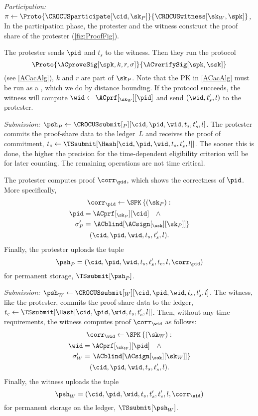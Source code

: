 \emph{Participation: \(\pi\gets
    \Proto{\CROCUSparticipate[\cid, \sk_P]}{\CROCUSwitness[\sk_W, \spk]}\),}
In the participation phase, the protester and 
the witness construct the proof share of the protester (\cref{fig:ProofFig}).

The protester sends \(\pid\) and \(t_s\) to the witness.
Then they run the protocol \[
  \Proto{\ACproveSig[\spk, k, r, \sigma]}{\ACverifySig[\spk, \ssk]}
\] (see \cref{ACacAlg}), \(k\) and \(r\) are part of \(\sk_P\).
Note that the \acf{PK} in \cref{ACacAlg} must be
run as a , which we do by distance bounding.
If the protocol succeeds, the witness will compute \(\wid \gets 
  \ACprf[_{\sk_W}][\pid]\) and send \((\wid, t_s', l)\) to the protester.


\emph{Submission: \(\psh_P\gets \CROCUSsubmit[_P][\cid, \pid, \wid, t_s, t_s',  l]\).}
The protester commits the proof-share data to the ledger~\(L\) and receives the 
proof of commitment, \(t_e\gets \TSsubmit[\Hash[\cid, \pid, \wid, t_s, t_s', 
  l]]\).
The sooner this is done, the higher the precision for the time-dependent 
eligibility criterion will be for later counting.
The remaining operations are not time critical.

The protester computes  proof \(\corr_{\pid}\), which shows the 
correctness of \(\pid\).
More specifically,
\begin{multline*}
  \corr_{\pid}\gets \SPK\left\{ (\sk_P) : \right. \\
    \begin{aligned}
      \pid &= \ACprf[_{\sk_P}][\cid] \quad \land \\
      \sigma_P' &= \left. \ACblind[\ACsign[_{\ssk}][\sk_P]] \right\}
    \end{aligned} \\
      (\cid, \pid, \wid, t_s, t_s', l).
\end{multline*}
Finally, the protester uploads the tuple \[
  \psh_P = (\cid, \pid, \wid, t_s, t_s', t_e, l, \corr_{\pid})
\] for permanent storage, \(\TSsubmit[\psh_P]\).

\emph{Submission: \(\psh_W\gets \CROCUSsubmit[_W][\cid, \pid, \wid, t_s, t_s', 
    l]\).}
The witness, like the protester, commits the proof-share data to the 
ledger, \(t_e\gets \TSsubmit[\Hash[\cid, \pid, \wid, t_s, t_s', l]]\).
Then, without any time requirements, the witness computes  proof 
\(\corr_{\wid}\) as follows:
\begin{multline*}
  \corr_{\wid}\gets \SPK\left\{ (\sk_W) : \right. \\
    \begin{aligned}
      \wid &= \ACprf[_{\sk_W}][\pid] \quad \land \\
      \sigma_W' &= \left. \ACblind[\ACsign[_{\ssk}][\sk_W]] \right\}
    \end{aligned} \\
      (\cid, \pid, \wid, t_s, t_s', l).
\end{multline*}
Finally, the witness uploads the tuple \[
  \psh_W = (\cid, \pid, \wid, t_s, t_s', t_e', l, \corr_{\wid})
\] for permanent storage on the ledger, \(\TSsubmit[\psh_W]\).


